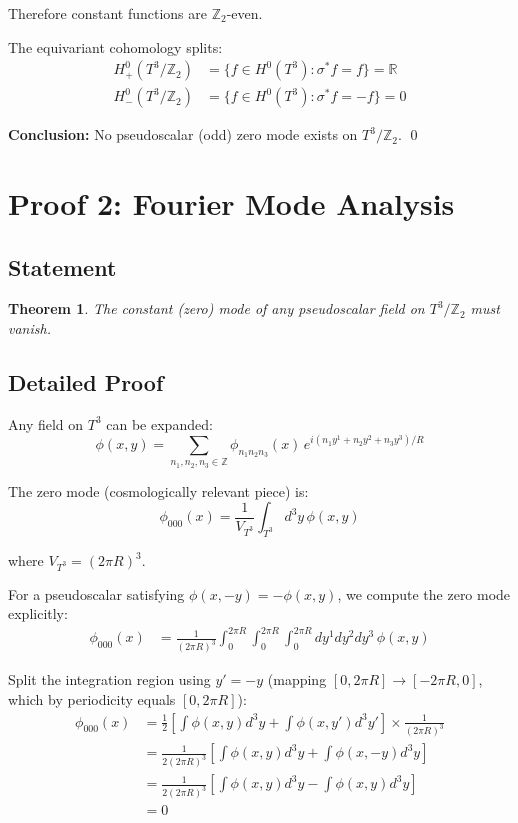 \documentclass[12pt,a4paper]{article}
\newtheorem{theorem}{Theorem}
\begin{document}
Therefore constant functions are $\mathbb{Z}_2$-even.

The equivariant cohomology splits:
\begin{align}
H^0_+(T^3/\mathbb{Z}_2) &= \{f \in H^0(T^3) : \sigma^* f = f\} = \mathbb{R} \\
H^0_-(T^3/\mathbb{Z}_2) &= \{f \in H^0(T^3) : \sigma^* f = -f\} = 0
\end{align}

\textbf{Conclusion:} No pseudoscalar (odd) zero mode exists on $T^3/\mathbb{Z}_2$. \qed

\section{Proof 2: Fourier Mode Analysis}

\subsection{Statement}

\begin{theorem}
The constant (zero) mode of any pseudoscalar field on $T^3/\mathbb{Z}_2$ must vanish.
\end{theorem}

\subsection{Detailed Proof}

Any field on $T^3$ can be expanded:
\begin{equation}
\phi(x, y) = \sum_{n_1, n_2, n_3 \in \mathbb{Z}} \phi_{n_1 n_2 n_3}(x) \, e^{i(n_1 y^1 + n_2 y^2 + n_3 y^3)/R}
\end{equation}

The zero mode (cosmologically relevant piece) is:
\begin{equation}
\phi_{000}(x) = \frac{1}{V_{T^3}} \int_{T^3} d^3y \, \phi(x, y)
\end{equation}

where $V_{T^3} = (2\pi R)^3$.

For a pseudoscalar satisfying $\phi(x, -y) = -\phi(x, y)$, we compute the zero mode explicitly:
\begin{align}
\phi_{000}(x) &= \frac{1}{(2\pi R)^3} \int_0^{2\pi R} \int_0^{2\pi R} \int_0^{2\pi R} dy^1 dy^2 dy^3 \, \phi(x, y)
\end{align}

Split the integration region using $y' = -y$ (mapping $[0, 2\pi R] \to [-2\pi R, 0]$, which by periodicity equals $[0, 2\pi R]$):
\begin{align}
\phi_{000}(x) &= \frac{1}{2} \left[ \int \phi(x, y) d^3y + \int \phi(x, y') d^3y' \right] \times \frac{1}{(2\pi R)^3} \\
&= \frac{1}{2(2\pi R)^3} \left[ \int \phi(x, y) d^3y + \int \phi(x, -y) d^3y \right] \\
&= \frac{1}{2(2\pi R)^3} \left[ \int \phi(x, y) d^3y - \int \phi(x, y) d^3y \right] \\
&= 0
\end{align}
\end{document}
